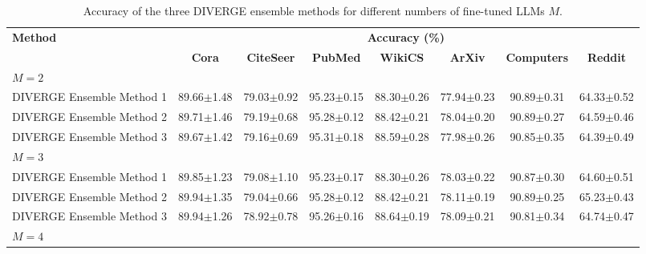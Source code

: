 \documentclass[a4paper,fleqn]{cas-sc}
\begin{document}
\begin{table}[htbp]
\centering
\caption{Accuracy of the three DIVERGE ensemble methods for different numbers of fine-tuned LLMs $M$.}
\label{tab:diverge_num_finetuned_llms}

\small
\setlength{\tabcolsep}{3pt}
\begin{tabular*}{\textwidth}{@{\extracolsep{\fill}} lccccccc @{}}
\toprule
\multirow{2}{*}{\textbf{Method}} & \multicolumn{7}{c}{\textbf{Accuracy (\%)}} \\
\cmidrule(lr){2-8}
 & \textbf{Cora} & \textbf{CiteSeer} & \textbf{PubMed} & \textbf{WikiCS} & \textbf{ArXiv} & \textbf{Computers} & \textbf{Reddit} \\
\midrule
\multicolumn{8}{l}{\textit{$M=2$}} \\
\midrule
DIVERGE Ensemble Method 1 & 89.66{\scriptsize$\pm$1.48} & 79.03{\scriptsize$\pm$0.92} & 95.23{\scriptsize$\pm$0.15} & 88.30{\scriptsize$\pm$0.26} & 77.94{\scriptsize$\pm$0.23} & 90.89{\scriptsize$\pm$0.31} & 64.33{\scriptsize$\pm$0.52} \\
DIVERGE Ensemble Method 2 & 89.71{\scriptsize$\pm$1.46} & 79.19{\scriptsize$\pm$0.68} & 95.28{\scriptsize$\pm$0.12} & 88.42{\scriptsize$\pm$0.21} & 78.04{\scriptsize$\pm$0.20} & 90.89{\scriptsize$\pm$0.27} & 64.59{\scriptsize$\pm$0.46} \\
DIVERGE Ensemble Method 3 & 89.67{\scriptsize$\pm$1.42} & 79.16{\scriptsize$\pm$0.69} & 95.31{\scriptsize$\pm$0.18} & 88.59{\scriptsize$\pm$0.28} & 77.98{\scriptsize$\pm$0.26} & 90.85{\scriptsize$\pm$0.35} & 64.39{\scriptsize$\pm$0.49} \\
\midrule
\multicolumn{8}{l}{\textit{$M=3$}} \\
\midrule
DIVERGE Ensemble Method 1 & 89.85{\scriptsize$\pm$1.23} & 79.08{\scriptsize$\pm$1.10} & 95.23{\scriptsize$\pm$0.17} & 88.30{\scriptsize$\pm$0.26} & 78.03{\scriptsize$\pm$0.22} & 90.87{\scriptsize$\pm$0.30} & 64.60{\scriptsize$\pm$0.51} \\
DIVERGE Ensemble Method 2 & 89.94{\scriptsize$\pm$1.35} & 79.04{\scriptsize$\pm$0.66} & 95.28{\scriptsize$\pm$0.12} & 88.42{\scriptsize$\pm$0.21} & 78.11{\scriptsize$\pm$0.19} & 90.89{\scriptsize$\pm$0.25} & 65.23{\scriptsize$\pm$0.43} \\
DIVERGE Ensemble Method 3 & 89.94{\scriptsize$\pm$1.26} & 78.92{\scriptsize$\pm$0.78} & 95.26{\scriptsize$\pm$0.16} & 88.64{\scriptsize$\pm$0.19} & 78.09{\scriptsize$\pm$0.21} & 90.81{\scriptsize$\pm$0.34} & 64.74{\scriptsize$\pm$0.47} \\
\midrule
\multicolumn{8}{l}{\textit{$M=4$}} \\

\end{tabular*}
\end{table}
\end{document}
